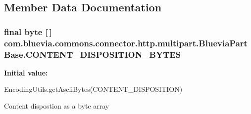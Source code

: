 \subsection{Member Data Documentation}
\hypertarget{classcom_1_1bluevia_1_1commons_1_1connector_1_1http_1_1multipart_1_1BlueviaPartBase_aaebbdce2d484b6e3e9361fd2fedea75d}{
\subsubsection[{CONTENT\_\-DISPOSITION\_\-BYTES}]{\setlength{\rightskip}{0pt plus 5cm}final byte \mbox{[}$\,$\mbox{]} {\bf com.bluevia.commons.connector.http.multipart.BlueviaPartBase.CONTENT\_\-DISPOSITION\_\-BYTES}}}
\label{classcom_1_1bluevia_1_1commons_1_1connector_1_1http_1_1multipart_1_1BlueviaPartBase_aaebbdce2d484b6e3e9361fd2fedea75d}
{\bfseries Initial value:}
\begin{DoxyCode}

      EncodingUtils.getAsciiBytes(CONTENT_DISPOSITION)
\end{DoxyCode}
Content dispostion as a byte array 
